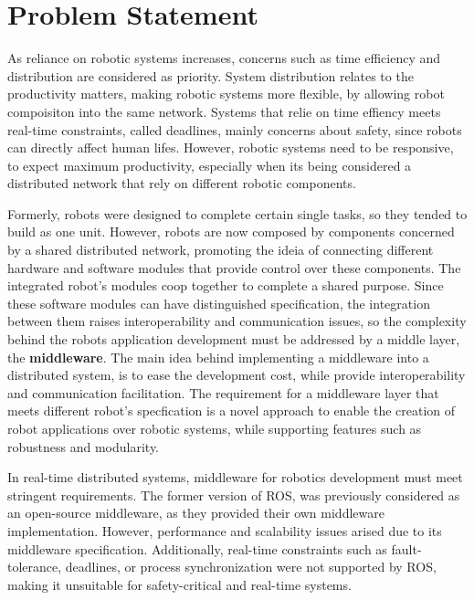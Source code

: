 \section{Problem Statement}\label{s:problem}

As reliance on robotic systems increases,  
concerns such as time efficiency and distribution are considered as priority. %
System distribution relates to the productivity matters, making robotic systems more flexible, by allowing robot compoisiton into the same network. Systems that relie on time effiency meets real-time constraints, called deadlines, mainly concerns about safety, since robots can directly affect human lifes. However, robotic systems need to be responsive, to expect maximum productivity, especially when its being considered a distributed network that rely on different robotic components. 

Formerly, robots were designed to complete certain single tasks, so they tended to build as one unit. However, robots are now composed by components concerned by a shared distributed network, promoting the ideia of connecting different hardware and software modules that provide control over these components. The integrated robot's modules coop together to complete a shared purpose. Since these software modules can have distinguished specification, the integration between them raises interoperability and communication issues, so the complexity behind the robots application development must be addressed by a middle layer, the \textbf{middleware}. The main idea behind implementing a middleware into a distributed system, is to ease the development cost, while provide interoperability and communication facilitation.\cite{mohamed2008middleware} The requirement for a middleware layer that meets different robot's specfication is a novel approach to enable the creation of robot applications over robotic systems, while supporting features such as robustness and modularity. 

In real-time distributed systems, middleware for robotics development must meet stringent requirements.\cite{maruyama2016exploring} The former version of ROS, was previously considered as an open-source middleware, as they provided their own middleware implementation. However, performance and scalability issues arised due to its middleware specification.\cite{intro-ros} Additionally, real-time constraints such as fault-tolerance, deadlines, or process synchronization were not supported by ROS, making it unsuitable for safety-critical and real-time systems.\cite{kim2018security} 

